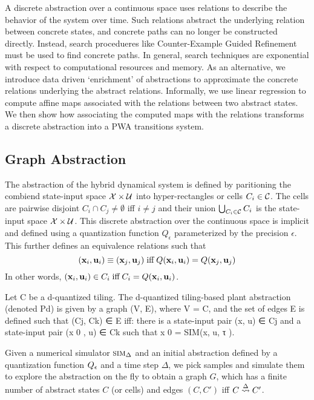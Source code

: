 
A discrete abstraction over a continuous space uses relations to
describe the behavior of the system over time. Such relations abstract
the underlying relation between concrete states, and concrete paths
can no longer be constructed directly. Instead, search procedueres
like Counter-Example Guided Refinement must be used to find concrete
paths. In general, search techniques are exponential with respect to
computational resources and memory. As an alternative, we introduce
data driven `enrichment' of abstractions to approximate the concrete
relations underlying the abstract relations. Informally, we use linear
regression to compute affine maps associated with the relations
between two abstract states. We then show how associating the computed
maps with the relations transforms a discrete abstraction into a PWA
transitions system.

\subsection{Graph Abstraction}

The abstraction of the hybrid dynamical system is defined by
paritioning the combiend state-input space $\mathcal{X} \times
\mathcal{U}$ into hyper-rectangles or cells $C_i \in \mathcal{C}$. The cells are
pairwise disjoint $C_i \cap C_j \neq \emptyset$ iff $i \neq j$ and
their union $\bigcup_{C_i\in\mathcal{C}}C_i$ is the state-input
space $\mathcal{X} \times \mathcal{U}$. This discrete abstraction over
the continuous space is implicit and defined using a quantization
function $Q_\epsilon$ parameterized by the precision $\epsilon$.
This further defines an equivalence relations such that
\[
    (\mathbf{x}_i, \mathbf{u}_i) \equiv (\mathbf{x}_j, \mathbf{u}_j) \;\text{iff}\; Q(\mathbf{x}_i,
    \mathbf{u}_i) = Q(\mathbf{x}_j, \mathbf{u}_j)
\]
In other words, $(\mathbf{x}_i, \mathbf{u}_i) \in C_i \; \text{iff} \; C_i =
Q(\mathbf{x}_i, \mathbf{u}_i)$.

\begin{definition}[] Let C be a d-quantized tiling. The d-quantized
    tiling-based plant abstraction (denoted Pd) is given by a graph
    (V, E), where V = C, and the set of edges E is defined such that
    (Cj, Ck) ∈ E iff: there is a state-input pair (x, u) ∈ Cj and a
state-input pair (x 0 , u) ∈ Ck such that x 0 = SIM(x, u, τ ).
\end{definition}


Given a numerical simulator $\mbox{\sc sim}_\Delta$ and an initial abstraction
defined by a quantization function $Q_\epsilon$ and a time step
$\Delta$, we pick samples and simulate them to explore the abstraction
on the fly to obtain a graph $G$, which has a finite number of
abstract states $C$ (or cells) and edges $(C,C')$ iff $C
\overset{\Delta}{\rightsquigarrow} C'$.


